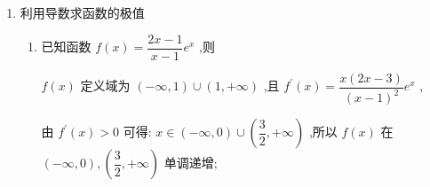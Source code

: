 \begin{enumerate}
\begin{enumerate}
\begin{jieda}
            所以 $g\left( 2\right)  = \dfrac{\ln 2}{2} > g\left( \sqrt{3}\right)  = \dfrac{\ln \sqrt{3}}{\sqrt{3}}$ ,也即 $\sqrt{3}\ln 2 > \ln 3 > \ln {e} = 1$ ,
            
            结合函数 $f\left( x\right)$ 在 $\left( {0, + \infty }\right)$ 上单调递增及偶函数可知 $a > b > c$ .
        \end{jieda}
        
        \item 已知 $a = \pi \ln 3,b = 3\ln \pi ,c = \dfrac{3\pi }{{e}}$ ，则
        \begin{jieda}
            因为 $a = \pi \ln 3,b = 3\ln \pi ,c = \dfrac{3\pi }{{e}}$ ,即 $\dfrac{a}{3\pi } = \dfrac{\ln 3}{3},\dfrac{b}{3\pi } = \dfrac{\ln \pi }{\pi },\dfrac{c}{3\pi } = \dfrac{1}{{e}} = \dfrac{\ln {e}}{{e}}$ ,
            
            根据特点设函数 $f\left( x\right)  = \dfrac{\ln x}{x},x > 0$ ,则 ${f}^{\prime }\left( x\right)  = \dfrac{1 - \ln x}{{x}^{2}}$ ,
            
            当 $x \in  \left( {{e}, + \infty }\right)$ 时， ${f}^{\prime }\left( x\right)  < 0$ ，可知 $f\left( x\right)$ 在 $\left( {{e}, + \infty }\right)$ 内单调递减，
            
            且 ${e} < 3 < \pi$ ，则 $f\left( {e}\right)  > f\left( 3\right)  > f\left( \pi \right)$ ，即 $\dfrac{c}{3\pi } > \dfrac{a}{3\pi } > \dfrac{b}{3\pi }$ ，所以 $b < a < c$ .
        \end{jieda}
    \end{enumerate}

    \item 利用导数求函数的极值
    \begin{enumerate}
        \item 已知函数 $f\left( x\right)  = \dfrac{{2x} - 1}{x - 1}{{e}}^{x}$ ,则

        \begin{jieda}
            $f\left( x\right)$ 定义域为 $\left( {-\infty ,1}\right)  \cup  \left( {1, + \infty }\right)$ ,且 ${f}^{\prime }\left( x\right)  = \dfrac{x\left( {{2x} - 3}\right) }{{\left( x - 1\right) }^{2}}{{e}}^{x}$ ,
            
            由 ${f}^{\prime }\left( x\right)  > 0$ 可得: $x \in  \left( {-\infty ,0}\right)  \cup  \left( {\dfrac{3}{2}, + \infty }\right)$ ,所以 $f\left( x\right)$ 在 $\left( {-\infty ,0}\right) ,\left( {\dfrac{3}{2}, + \infty }\right)$ 单调递增;
            

\end{jieda}
\end{enumerate}
\end{enumerate}
